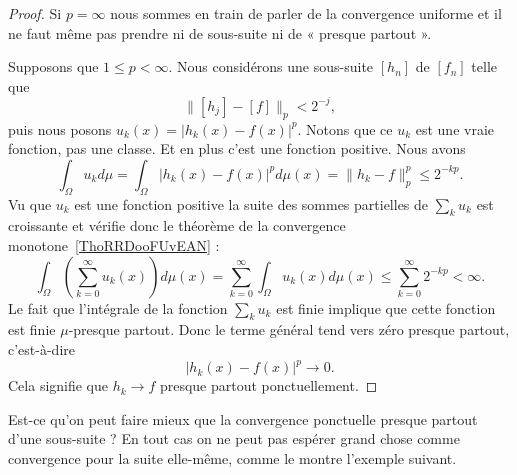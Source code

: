\begin{proof}
	Si \( p=\infty\) nous sommes en train de parler de la convergence uniforme et il ne faut même pas prendre ni de sous-suite ni de « presque partout ».

	Supposons que \( 1\leq p<\infty\). Nous considérons une sous-suite \( [h_n]\) de \( [f_n]\) telle que
	\begin{equation}
		\| [h_j]-[f] \|_p<2^{-j},
	\end{equation}
	puis nous posons \( u_k(x)=| h_k(x)-f(x) |^p\). Notons que ce \( u_k\) est une vraie fonction, pas une classe. Et en plus c'est une fonction positive. Nous avons
	\begin{equation}
		\int_{\Omega}u_kd\mu=\int_{\Omega}| h_k(x)-f(x) |^pd\mu(x)=\| h_k-f \|_p^p\leq 2^{-kp}.
	\end{equation}
	Vu que \( u_k\) est une fonction positive la suite des sommes partielles de \( \sum_ku_k\) est croissante et vérifie donc le théorème de la convergence monotone~\ref{ThoRRDooFUvEAN} :
	\begin{equation}
		\int_{\Omega}\left( \sum_{k=0}^{\infty}u_k(x) \right)d\mu(x)=\sum_{k=0}^{\infty}\int_{\Omega}u_k(x)d\mu(x)
		\leq\sum_{k=0}^{\infty}2^{-kp}<\infty.
	\end{equation}
	Le fait que l'intégrale de la fonction \( \sum_ku_k\) est finie implique que cette fonction est finie \( \mu\)-presque partout. Donc le terme général tend vers zéro presque partout, c'est-à-dire
	\begin{equation}
		| h_k(x)-f(x) |^p\to 0.
	\end{equation}
	Cela signifie que \( h_k\to f\) presque partout ponctuellement.
\end{proof}

Est-ce qu'on peut faire mieux que la convergence ponctuelle presque partout d'une sous-suite ? En tout cas on ne peut pas espérer grand chose comme convergence pour la suite elle-même, comme le montre l'exemple suivant.

